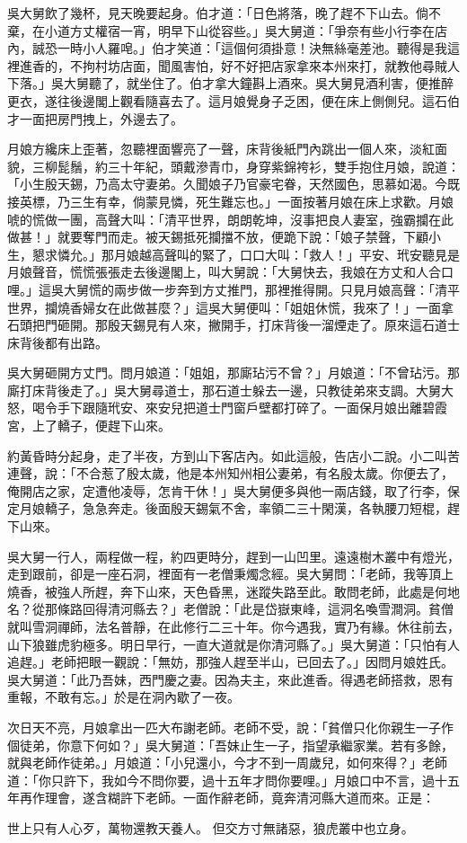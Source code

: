 吳大舅飲了幾杯，見天晚要起身。伯才道：「日色將落，晚了趕不下山去。倘不棄，在小道方丈權宿一宵，明早下山從容些。」吳大舅道：「爭奈有些小行李在店內，誠恐一時小人羅唣。」伯才笑道：「這個何須掛意！決無絲毫差池。聽得是我這裡進香的，不拘村坊店面，聞風害怕，好不好把店家拿來本州來打，就教他尋賊人下落。」吳大舅聽了，就坐住了。伯才拿大鐘斟上酒來。吳大舅見酒利害，便推醉更衣，遂往後邊閣上觀看隨喜去了。這月娘覺身子乏困，便在床上側側兒。這石伯才一面把房門拽上，外邊去了。

月娘方纔床上歪著，忽聽裡面響亮了一聲，床背後紙門內跳出一個人來，淡紅面貌，三柳髭鬚，約三十年紀，頭戴滲青巾，身穿紫錦袴衫，雙手抱住月娘，說道： 「小生殷天錫，乃高太守妻弟。久聞娘子乃官豪宅眷，天然國色，思慕如渴。今既接英標，乃三生有幸，倘蒙見憐，死生難忘也。」一面按著月娘在床上求歡。月娘唬的慌做一團，高聲大叫：「清平世界，朗朗乾坤，沒事把良人妻室，強霸攔在此做甚！」就要奪門而走。被天錫抵死攔擋不放，便跪下說：「娘子禁聲，下顧小生，懇求憐允。」那月娘越高聲叫的緊了，口口大叫：「救人！」平安、玳安聽見是月娘聲音，慌慌張張走去後邊閣上，叫大舅說：「大舅快去，我娘在方丈和人合口哩。」這吳大舅慌的兩步做一步奔到方丈推門，那裡推得開。只見月娘高聲：「清平世界，攔燒香婦女在此做甚麼？」這吳大舅便叫：「姐姐休慌，我來了！」一面拿石頭把門砸開。那殷天錫見有人來，撇開手，打床背後一溜煙走了。原來這石道士床背後都有出路。

吳大舅砸開方丈門。問月娘道：「姐姐，那廝玷污不曾？」月娘道：「不曾玷污。那廝打床背後走了。」吳大舅尋道士，那石道士躲去一邊，只教徒弟來支調。大舅大怒，喝令手下跟隨玳安、來安兒把道士門窗戶壁都打碎了。一面保月娘出離碧霞宮，上了轎子，便趕下山來。

約黃昏時分起身，走了半夜，方到山下客店內。如此這般，告店小二說。小二叫苦連聲，說：「不合惹了殷太歲，他是本州知州相公妻弟，有名殷太歲。你便去了，俺開店之家，定遭他凌辱，怎肯干休！」吳大舅便多與他一兩店錢，取了行李，保定月娘轎子，急急奔走。後面殷天錫氣不舍，率領二三十閑漢，各執腰刀短棍，趕下山來。

吳大舅一行人，兩程做一程，約四更時分，趕到一山凹里。遠遠樹木叢中有燈光，走到跟前，卻是一座石洞，裡面有一老僧秉燭念經。吳大舅問：「老師，我等頂上燒香，被強人所趕，奔下山來，天色昏黑，迷蹤失路至此。敢問老師，此處是何地名？從那條路回得清河縣去？」老僧說：「此是岱嶽東峰，這洞名喚雪澗洞。貧僧就叫雪洞禪師，法名普靜，在此修行二三十年。你今遇我，實乃有緣。休往前去，山下狼雖虎豹極多。明日早行，一直大道就是你清河縣了。」吳大舅道：「只怕有人追趕。」老師把眼一觀說：「無妨，那強人趕至半山，已回去了。」因問月娘姓氏。吳大舅道：「此乃吾妹，西門慶之妻。因為夫主，來此進香。得遇老師搭救，恩有重報，不敢有忘。」於是在洞內歇了一夜。

次日天不亮，月娘拿出一匹大布謝老師。老師不受，說：「貧僧只化你親生一子作個徒弟，你意下何如？」吳大舅道：「吾妹止生一子，指望承繼家業。若有多餘，就與老師作徒弟。」月娘道：「小兒還小，今才不到一周歲兒，如何來得？」老師道：「你只許下，我如今不問你要，過十五年才問你要哩。」月娘口中不言，過十五年再作理會，遂含糊許下老師。一面作辭老師，竟奔清河縣大道而來。正是：

世上只有人心歹，萬物還教天養人。
但交方寸無諸惡，狼虎叢中也立身。


